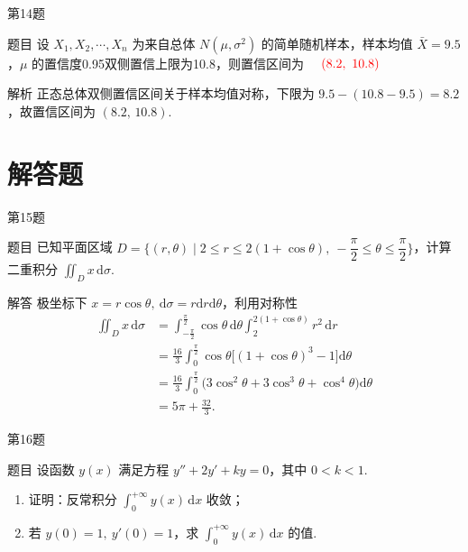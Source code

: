 \documentclass[aspectratio=169]{beamer}
\begin{document}
\begin{frame}{第14题}
\begin{block}{题目}
设 \(X_{1}, X_{2}, \cdots, X_{n}\) 为来自总体 \(N(\mu, \sigma^{2})\) 的简单随机样本，样本均值 \(\bar{X}=9.5\)，$\mu$ 的置信度0.95双侧置信上限为10.8，则置信区间为 \underline{$\quad \textcolor{red}{(8.2,\ 10.8)}\quad$} 
\end{block}

\begin{block}{解析}
正态总体双侧置信区间关于样本均值对称，下限为 $9.5-(10.8-9.5)=8.2$，故置信区间为 $(8.2,\,10.8)$.
\end{block}
\end{frame}

\section{解答题}

\begin{frame}{第15题}
\begin{block}{题目}
已知平面区域 \(D=\{(r, \theta) \mid 2 \leqslant r \leqslant 2(1+\cos \theta),\ -\dfrac{\pi}{2} \leqslant \theta \leqslant \dfrac{\pi}{2}\}\)，计算二重积分 \(\displaystyle\iint_{D} x\,\mathrm{d}\sigma\).
\end{block}
\begin{block}{解答}
极坐标下 \(x=r\cos\theta,\ \mathrm{d}\sigma=r\mathrm{d}r\mathrm{d}\theta\)，利用对称性
\begin{align*}
\iint_D x\,\mathrm{d}\sigma &= \int_{-\frac{\pi}{2}}^{\frac{\pi}{2}} \cos\theta \,\mathrm{d}\theta \int_{2}^{2(1+\cos\theta)} r^2 \,\mathrm{d}r \\
&= \frac{16}{3}\int_{0}^{\frac{\pi}{2}} \cos\theta\big[(1+\cos\theta)^3-1\big]\mathrm{d}\theta \\
&= \frac{16}{3}\int_{0}^{\frac{\pi}{2}} \big(3\cos^2\theta+3\cos^3\theta+\cos^4\theta\big)\mathrm{d}\theta \\
&= 5\pi+\frac{32}{3}.
\end{align*}
\end{block}
\end{frame}

\begin{frame}{第16题}
\begin{block}{题目}
设函数 \(y(x)\) 满足方程 \(y''+2 y'+k y=0\)，其中 \(0<k<1\).
\begin{enumerate}[(1)]
\item 证明：反常积分 \(\displaystyle\int_{0}^{+\infty} y(x) \,\mathrm{d}x\) 收敛；

\item 若 \(y(0)=1,\ y'(0)=1\)，求 \(\displaystyle\int_{0}^{+\infty} y(x) \,\mathrm{d}x\) 的值.
\end{enumerate} 
\end{block}
\end{frame}
\end{document}
